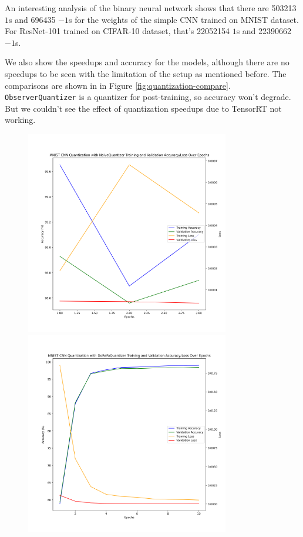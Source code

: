 \documentclass{article}
\begin{document}
An interesting analysis of the binary neural network shows that there are 503213 $1$s and 696435 $-1$s for the weights of the simple CNN trained on MNIST dataset. For ResNet-101 trained on CIFAR-10 dataset, that's 22052154 $1$s and 22390662 $-1$s.

We also show the speedups and accuracy for the models, although there are no speedups to be seen with the limitation of the setup as mentioned before. The comparisons are shown in in Figure \ref{fig:quantization-compare}. \verb|ObserverQuantizer| is a quantizer for post-training, so accuracy won't degrade. But we couldn't see the effect of quantization speedups due to TensorRT not working.

\begin{figure}
	\centerline{\includegraphics[width=3.5in]{../proj2/figures/mnist_cnn_NaiveQuantizer.png}\includegraphics[width=3.5in]{../proj2/figures/mnist_cnn_DoReFaQuantizer.png}}

\end{figure}
\end{document}
